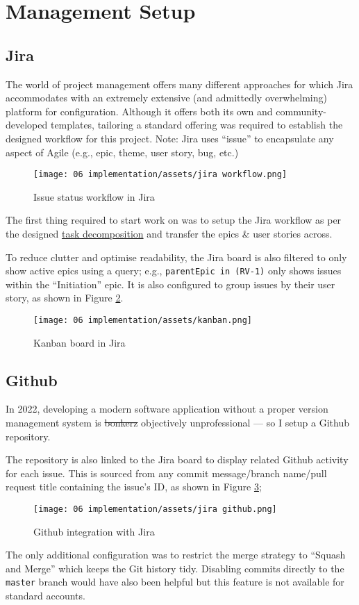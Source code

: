 \section{Management Setup}

\subsection{Jira}
The world of project management offers many different
approaches for which Jira accommodates with an extremely
extensive (and admittedly overwhelming) platform for
configuration.
Although it offers both its own and community-developed
templates, tailoring a standard offering was required to
establish the designed workflow for this project.
Note: Jira uses \enquote{issue} to encapsulate any aspect
of Agile (e.g., epic, theme, user story, bug, etc.)

\begin{figure}[h]
  \centering
  \texttt{[image: 06
    implementation/assets/jira workflow.png]}
  \caption{Issue status workflow in Jira}
  \label{fig:workflow}
\end{figure}

The first thing required to start work on \projectname{}
was to setup the Jira workflow as per the designed
\hyperref[p:decomp]{task decomposition} and transfer the
epics \& user stories across.

To reduce clutter and optimise readability, the Jira board
is also filtered to only show active epics using a query;
e.g., \lstinline{parentEpic in (RV-1)} only shows issues
within the \enquote{Initiation} epic.
It is also configured to group issues by their user story,
as shown in Figure \ref{fig:kanban}.

\begin{figure}[h]
  \centering
  \texttt{[image: 06
    implementation/assets/kanban.png]}
  \caption{Kanban board in Jira}
  \label{fig:kanban}
\end{figure}

\subsection{Github}
In 2022, developing a modern software application without a
proper version management system is
\sout{bonkerz} objectively unprofessional --- so I setup a
Github repository. 

The repository is also linked to the Jira board to display
related Github activity for each issue. This is sourced from 
any commit message/branch name/pull request title
containing the issue's ID, as shown in Figure
\ref{fig:jiraGithub};

\begin{figure}[h]
  \centering
  \texttt{[image: 06
    implementation/assets/jira github.png]}
  \caption{Github integration with Jira}
  \label{fig:jiraGithub}
\end{figure}

The only additional configuration was to restrict the merge
strategy to \enquote{Squash and Merge} which keeps the Git
history tidy. Disabling commits directly to the
\lstinline{master} branch would have also been helpful but
this feature is not available for standard accounts.